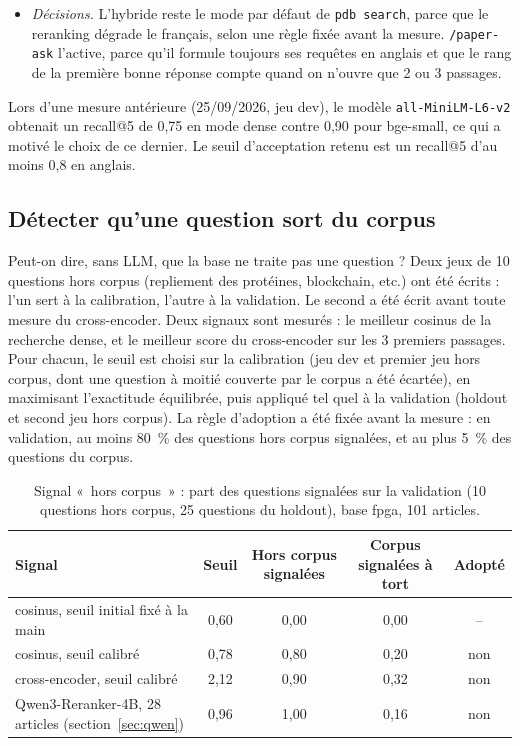 \documentclass[11pt,a4paper]{article}
\newcommand{\cmd}[1]{\texttt{#1}}
\newcommand{\gl}[2]{\hyperlink{gl:#1}{\textcolor{glcolor}{#2}}}
\begin{document}
\begin{itemize}
    résiste mieux, alors que le modèle n'est pas conçu comme multilingue. Le
    reranking, entraîné sur \gl{MSMARCO}{MS MARCO} en anglais, dégrade le classement. Le moteur \gl{GPU}{GPU}
    (section~\ref{sec:qwen}) faisait nettement mieux sur ce jeu.
  \item \emph{Décisions.} L'hybride reste le mode par défaut de \cmd{pdb search}, parce que le
    reranking dégrade le français, selon une règle fixée avant la mesure. \cmd{/paper-ask}
    l'active, parce qu'il formule toujours ses requêtes en anglais et que le rang de la
    première bonne réponse compte quand on n'ouvre que 2 ou 3 passages.
\end{itemize}

Lors d'une mesure antérieure (25/09/2026, jeu dev), le modèle \cmd{all-MiniLM-L6-v2}
obtenait un recall@5 de 0,75 en mode dense contre 0,90 pour bge-small, ce qui a motivé le
choix de ce dernier. Le seuil d'acceptation retenu est un recall@5 d'au moins 0,8 en
anglais.

\subsection{Détecter qu'une question sort du corpus}
\label{sec:horscorpus}

Peut-on dire, sans LLM, que la base ne traite pas une question ? Deux jeux de 10 questions
hors corpus (repliement des protéines, blockchain, etc.) ont été écrits : l'un sert à la
calibration, l'autre à la validation. Le second a été écrit avant toute mesure du
cross-encoder. Deux signaux sont mesurés : le meilleur cosinus de la recherche dense, et le
meilleur score du cross-encoder sur les 3 premiers passages. Pour chacun, le seuil est
choisi sur la calibration (jeu dev et premier jeu hors corpus, dont une question à moitié
couverte par le corpus a été écartée), en maximisant l'exactitude
équilibrée, puis appliqué tel quel à la validation (holdout et second jeu hors corpus). La
règle d'adoption a été fixée avant la mesure : en validation, au moins 80~\% des questions
hors corpus signalées, et au plus 5~\% des questions du corpus.

\begin{table}[ht]
\centering
\caption{Signal «~hors corpus~» : part des questions signalées sur la validation (10
questions hors corpus, 25 questions du holdout), base fpga, 101 articles.}
\label{tab:horscorpus}
\small
\begin{tabular}{@{}lcccc@{}}
\toprule
Signal & Seuil & Hors corpus signalées & Corpus signalées à tort & Adopté \\
\midrule
cosinus, seuil initial fixé à la main & 0,60 & 0,00 & 0,00 & -- \\
cosinus, seuil calibré & 0,78 & 0,80 & 0,20 & non \\
cross-encoder, seuil calibré & 2,12 & 0,90 & 0,32 & non \\
\midrule
Qwen3-Reranker-4B, 28 articles (section~\ref{sec:qwen}) & 0,96 & 1,00 & 0,16 & non \\
\bottomrule
\end{tabular}
\end{table}
\end{document}
